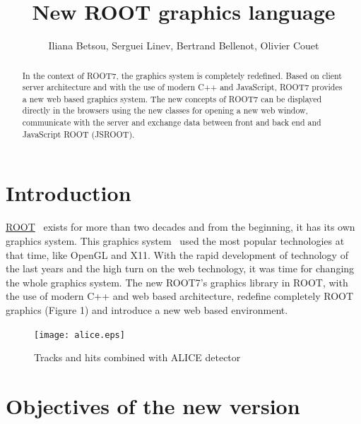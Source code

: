 \documentclass[a4paper]{jpconf}
\begin{document}
\title{New ROOT graphics language}

\author{Iliana Betsou, Serguei Linev, Bertrand Bellenot, Olivier Couet}

\address{Production Editor, \jpcs, \iopp, Dirac House, Temple Back, Bristol BS1~6BE, UK}


\begin{abstract}
In the context of ROOT7, the graphics system is completely redefined. Based on client
server architecture and with the use of modern C++ and JavaScript, ROOT7 provides a
new web based graphics system. The new concepts of ROOT7 can be displayed directly
in the browsers using the new classes for opening a new web window, communicate
with the server and exchange data between front and back end and JavaScript ROOT (JSROOT).
\end{abstract}

\section{Introduction}
\href{https://root.cern.ch/}{ROOT}~\cite{root} exists for more than two decades and
from the beginning, it has its own graphics system. This graphics system~\cite{Antcheva:2011zz}
used the most popular technologies at that time, like OpenGL and X11. With the rapid development
of technology of the last years and the high turn on the web technology, it was time for
changing the whole graphics system. The new ROOT7's graphics library in ROOT, with the
use of modern C++ and web based architecture, redefine completely ROOT graphics (Figure 1)
 and introduce a new web based environment.
\\
\begin{figure}[h]
  \begin{center}
    \texttt{[image: alice.eps]}\hspace{2pc}%
  \end{center}
\centering
\begin{minipage}[b]{25pc}\caption{\label{label}Tracks and hits combined with ALICE detector}
\end{minipage}
\end{figure}


\section{Objectives of the new version}
\end{document}
